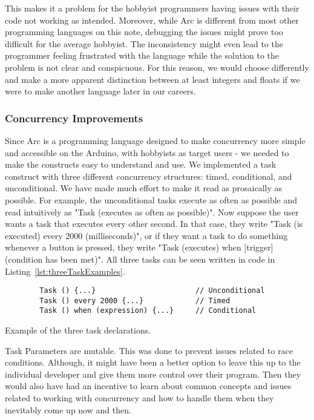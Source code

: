 This makes it a problem for the hobbyist programmers having issues with their code not working as intended. Moreover, while Arc is different from most other programming languages on this note, debugging the issues might prove too difficult for the average hobbyist. The inconsistency might even lead to the programmer feeling frustrated with the language while the solution to the problem is not clear and conspicuous. For this reason, we would choose differently and make a more apparent distinction between at least integers and floats if we were to make another language later in our careers.

\subsubsection{Concurrency Improvements}

Since Arc is a programming language designed to make concurrency more simple and accessible on the Arduino, with hobbyists as target users - we needed to make the constructs easy to understand and use. We implemented a task construct with three different concurrency structures: timed, conditional, and unconditional. We have made much effort to make it read as prosaically as possible. For example, the unconditional tasks execute as often as possible and read intuitively as "Task (executes as often as possible)". Now suppose the user wants a task that executes every other second. In that case, they write "Task (is executed) every 2000 (milliseconds)", or if they want a task to do something whenever a button is pressed, they write "Task (executes) when [trigger] (condition has been met)". All three tasks can be seen written in code in Listing~\ref{lst:threeTaskExamples}.

\begin{listing}[htb!]
    \begin{verbatim}
        Task () {...}                       // Unconditional
        Task () every 2000 {...}            // Timed
        Task () when (expression) {...}     // Conditional
    \end{verbatim}
    \caption{Example of the three task declarations.}
    \label{lst:threeTaskExamples}
\end{listing}

Task Parameters are mutable. This was done to prevent issues related to race conditions. Although, it might have been a better option to leave this up to the individual developer and give them more control over their program. Then they would also have had an incentive to learn about common concepts and issues related to working with concurrency and how to handle them when they inevitably come up now and then.

